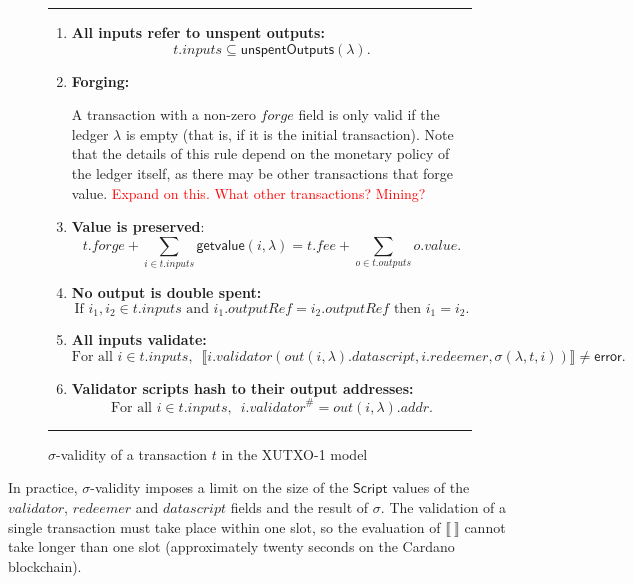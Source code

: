 \documentclass[a4paper]{article}
\newcommand{\red}[1]{\textcolor{red}{#1}}
\theoremstyle{definition}  %
\newcommand\rfskip{7pt}
\newenvironment{ruledfigure}[1]{\begin{figure}[#1]\hrule\vspace{\rfskip}}{\vspace{\rfskip}\hrule\end{figure}}
\newcommand{\mi}[1]{\ensuremath{\mathit{#1}}}
\newcommand{\inputs}{\mi{inputs}}
\newcommand{\outputs}{\mi{outputs}}
\newcommand{\forge}{\mi{forge}}
\newcommand{\fee}{\mi{fee}}
\newcommand{\addr}{\mi{addr}}
\newcommand{\val}{\mi{value}}  %
\newcommand{\validator}{\mi{validator}}
\newcommand{\redeemer}{\mi{redeemer}}
\newcommand{\datascript}{\mi{datascript}}
\newcommand{\txout}{\mi{out}}
\newcommand{\getvalue}{\msf{getvalue}}
\newcommand{\msf}[1]{\ensuremath{\mathsf{#1}}}
\newcommand{\unspent}{\msf{unspentOutputs}}
\begin{document}
\begin{ruledfigure}{H}
\begin{enumerate}
    \item \label{rule:all-inputs-refer-to-unspent-outputs} \textbf{All
      inputs refer to unspent outputs:}
      \[
        t.\inputs \subseteq \unspent(\lambda).
      \]
    \item\label{rule:forging} \textbf{Forging:}
      \begin{center}
        \parbox{0.8\textwidth}{
        A transaction with a non-zero \forge{} field is only
        valid if the ledger $\lambda$ is empty
        (that is, if it is the initial
        transaction). Note that the details of this rule depend on the
        monetary policy of the ledger itself, as there may be other
        transactions that forge value. \red{Expand on this.  What other transactions?  Mining?}
        }
    \end{center}
      
    \item \label{rule:value-is-preserved} \textbf{Value is preserved}:
    \[
      t.\forge + \sum_{i \in t.\inputs} \getvalue(i, \lambda) = t.\fee + \sum_{o \in t.\outputs} o.\val.
    \]
    \item \label{rule:no-double-spending} \textbf{No output is double spent:}
    \[
     \textrm{If } i_1, i_2 \in t.\inputs \textrm{ and }  i_1.\mathit{outputRef} = i_2.\mathit{outputRef}
     \textrm{ then } i_1 = i_2.
    \]
    \item\label{rule:all-inputs-validate} \textbf{All inputs validate:}
    \[
    \textrm{For all } i \in t.\inputs,\enspace \llbracket
    i.\validator(\txout(i, \lambda).\datascript,i.\redeemer, \sigma(\lambda, t, i)) \rrbracket \ne \textsf{error}.
      \]
    \item\label{rule:validator-scripts-hash} \textbf{Validator scripts hash to their output addresses:}
    \[
      \textrm{For all } i \in t.\inputs,\enspace i.\validator^{\#} = \txout(i, \lambda).\addr.
    \]
\end{enumerate}
\caption{$\sigma$-validity of a transaction $t$ in the XUTXO-1 model}
\label{fig:xutxo-1-validity}
\end{ruledfigure}



\noindent In practice, $\sigma$-validity imposes a limit on the size
of the $\mathsf{Script}$ values of the $\validator$, $\redeemer$ and
$\datascript$ fields and the result of $\sigma$. The validation of a
single transaction must take place within one slot, so the evaluation
of $\llbracket ~ \rrbracket$ cannot take longer than one slot
(approximately twenty seconds on the Cardano blockchain).
\end{document}
